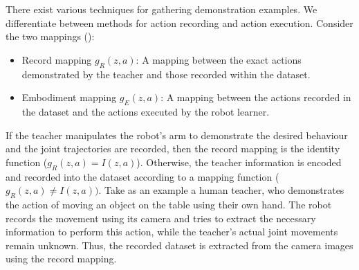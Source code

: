 There exist various techniques for gathering demonstration examples.
 We differentiate between methods for action recording and action execution.
 Consider the two mappings (\cite{argall2009survey}):
\begin{itemize}
\item Record mapping $g_R(z,a)$: A mapping between the exact actions demonstrated by the teacher and those recorded within the dataset.
\item Embodiment mapping $g_E(z,a)$: A mapping between the actions recorded in the dataset and the actions executed by the robot learner.
\end{itemize}
If the teacher manipulates the robot's arm to demonstrate the desired behaviour and the joint trajectories are recorded, then the record mapping is the identity function ($g_R(z,a) = I(z,a)$).
 Otherwise, the teacher information is encoded and recorded into the dataset according to a mapping function ($g_R(z,a) \neq I(z,a))$.
 Take as an example a human teacher, who demonstrates the action of moving an object on the table using their own hand.
 The robot records the movement using its camera and tries to extract the necessary information to perform this action, while the teacher's actual joint movements remain unknown.
 Thus, the recorded dataset is extracted from the camera images using the record mapping.

